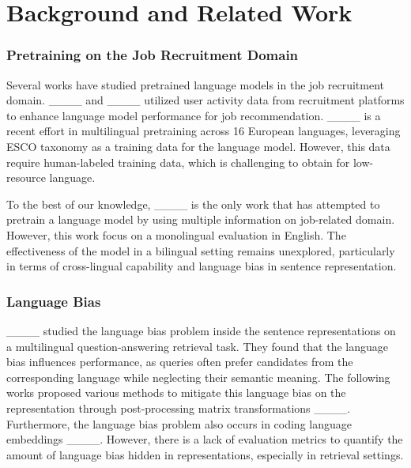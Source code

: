 \section{Background and Related Work}
\subsubsection{Pretraining on the Job Recruitment Domain} Several works have studied pretrained language models in the job recruitment domain. ____  and ____  utilized user activity data from recruitment platforms to enhance language model performance for job recommendation. ____  is a recent effort in multilingual pretraining across 16 European languages, leveraging ESCO taxonomy as a training data for the language model. However, this data require human-labeled training data, which is challenging to obtain for low-resource language. 

To the best of our knowledge, ____  is the only work that has attempted to pretrain a language model by using multiple information on job-related domain. However, this work focus on a monolingual evaluation in English. The effectiveness of the model in a bilingual setting remains unexplored, particularly in terms of cross-lingual capability and language bias in sentence representation. 


\subsubsection{Language Bias} ____  studied the language bias problem inside the sentence representations on a multilingual question-answering retrieval task. They found that the language bias influences performance, as queries often prefer candidates from the corresponding language while neglecting their semantic meaning. The following works proposed various methods to mitigate this language bias on the representation through post-processing matrix transformations ____. Furthermore, the language bias problem also occurs in coding language embeddings ____. However, there is a lack of evaluation metrics to quantify the amount of language bias hidden in representations, especially in retrieval settings.